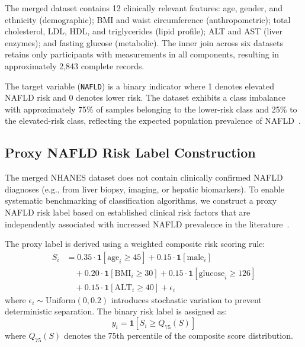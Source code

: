 \documentclass[conference,10pt]{IEEEtran}
\newcommand{\ind}{\mathbf{1}}
\begin{document}
The merged dataset contains 12 clinically relevant features: age, gender, and ethnicity (demographic); BMI and waist circumference (anthropometric); total cholesterol, LDL, HDL, and triglycerides (lipid profile); ALT and AST (liver enzymes); and fasting glucose (metabolic). The inner join across six datasets retains only participants with measurements in all components, resulting in approximately 2,843 complete records.

The target variable (\texttt{NAFLD}) is a binary indicator where 1 denotes elevated NAFLD risk and 0 denotes lower risk. The dataset exhibits a class imbalance with approximately 75\% of samples belonging to the lower-risk class and 25\% to the elevated-risk class, reflecting the expected population prevalence of NAFLD~\cite{younossi2016global}.

\subsection{Proxy NAFLD Risk Label Construction}
\label{subsec:proxy_label}

The merged NHANES dataset does not contain clinically confirmed NAFLD diagnoses (e.g., from liver biopsy, imaging, or hepatic biomarkers). To enable systematic benchmarking of classification algorithms, we construct a proxy NAFLD risk label based on established clinical risk factors that are independently associated with increased NAFLD prevalence in the literature~\cite{younossi2016global, chalasani2018diagnosis}.

The proxy label is derived using a weighted composite risk scoring rule:
\begin{equation}
\begin{split}
S_i &= 0.35 \cdot \ind[\text{age}_i \geq 45]
    + 0.15 \cdot \ind[\text{male}_i] \\
    &\quad + 0.20 \cdot \ind[\text{BMI}_i \geq 30]
    + 0.15 \cdot \ind[\text{glucose}_i \geq 126] \\
    &\quad + 0.15 \cdot \ind[\text{ALT}_i \geq 40]
     + \epsilon_i
\end{split}
\label{eq:risk_score}
\end{equation}
where $\epsilon_i \sim \text{Uniform}(0, 0.2)$ introduces stochastic variation to prevent deterministic separation. The binary risk label is assigned as:
\begin{equation}
y_i = \ind[S_i \geq Q_{75}(S)]
\end{equation}
where $Q_{75}(S)$ denotes the 75th percentile of the composite score distribution.
\end{document}
